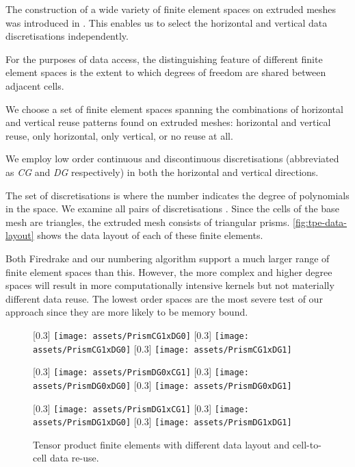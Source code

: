 \documentclass[11pt, a4paper]{scrartcl}
\begin{document}
The construction of a wide variety of finite element spaces on
extruded meshes was introduced in \citet{McRae:2016}. This enables us
to select the horizontal and vertical data discretisations
independently.

For the purposes of data access, the distinguishing feature of
different finite element spaces is the extent to which degrees of
freedom are shared between adjacent cells.

We choose a set of finite element spaces spanning the combinations of
horizontal and vertical reuse patterns found on extruded meshes:
horizontal and vertical reuse, only horizontal, only vertical, or no
reuse at all.

We employ low order continuous and discontinuous discretisations
(abbreviated as \emph{CG} and \emph{DG} respectively) in both the
horizontal and vertical directions.

The set of discretisations is
 where the number
indicates the degree of polynomials in the space. We examine all pairs
of discretisations . Since the cells of the
base mesh are triangles, the extruded mesh consists of triangular
prisms. \autoref{fig:tpe-data-layout} shows the data layout of each of
these finite elements.

Both Firedrake and our numbering algorithm support a much larger range
of finite element spaces than this. However, the more complex and
higher degree spaces will result in more computationally intensive
kernels but not materially different data reuse. The lowest order
spaces are the most severe test of our approach since they are more
likely to be memory bound.

\begin{figure}
  \centering
  [0.3\linewidth]
  {\texttt{[image: assets/PrismCG1xDG0]}}
  [0.3\linewidth]
  {\texttt{[image: assets/PrismCG1xDG0]}}
  [0.3\linewidth]
  {\texttt{[image: assets/PrismCG1xDG1]}}

  \vspace{1em}
  [0.3\linewidth]
  {\texttt{[image: assets/PrismDG0xCG1]}}
  [0.3\linewidth]
  {\texttt{[image: assets/PrismDG0xDG0]}}
  [0.3\linewidth]
  {\texttt{[image: assets/PrismDG0xDG1]}}

  \vspace{1em}
  [0.3\linewidth]
  {\texttt{[image: assets/PrismDG1xCG1]}}
  [0.3\linewidth]
  {\texttt{[image: assets/PrismDG1xDG0]}}
  [0.3\linewidth]
  {\texttt{[image: assets/PrismDG1xDG1]}}
  \caption{Tensor product finite elements with different data layout
    and cell-to-cell data re-use.}
\label{fig:tpe-data-layout}
\end{figure}
\end{document}
